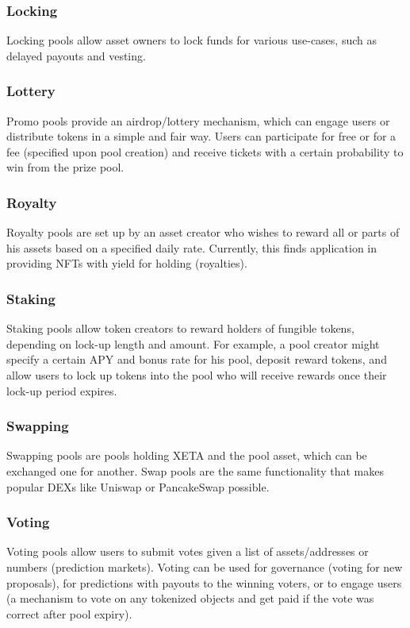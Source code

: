 \documentclass{article}
\begin{document}
\subsubsection{Locking}
Locking pools allow asset owners to lock funds for various use-cases, such as delayed payouts and vesting.

\subsubsection{Lottery}
Promo pools provide an airdrop/lottery mechanism, which can engage users or distribute tokens in a simple and fair way. Users can participate for free or for a fee (specified upon pool creation) and receive tickets with a certain probability to win from the prize pool.

\subsubsection{Royalty}
Royalty pools are set up by an asset creator who wishes to reward all or parts of his assets based on a specified daily rate. Currently, this finds application in providing NFTs with yield for holding (royalties).

\subsubsection{Staking}
Staking pools allow token creators to reward holders of fungible tokens, depending on lock-up length and amount. For example, a pool creator might specify a certain APY and bonus rate for his pool, deposit reward tokens, and allow users to lock up tokens into the pool who will receive rewards once their lock-up period expires.

\subsubsection{Swapping}
Swapping pools are pools holding XETA and the pool asset, which can be exchanged one for another. Swap pools are the same functionality that makes popular DEXs like Uniswap or PancakeSwap possible.

\subsubsection{Voting}
Voting pools allow users to submit votes given a list of assets/addresses or numbers (prediction markets). Voting can be used for governance (voting for new proposals), for predictions with payouts to the winning voters, or to engage users (a mechanism to vote on any tokenized objects and get paid if the vote was correct after pool expiry).
\end{document}
